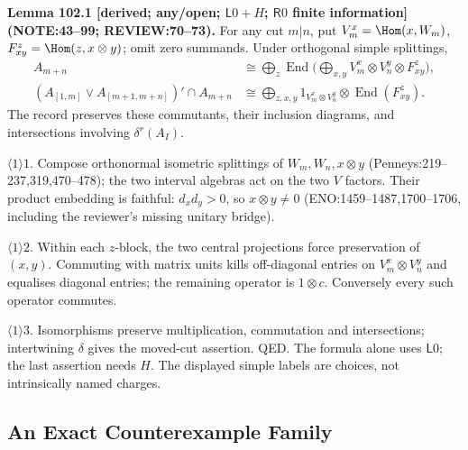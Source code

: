 \textbf{Lemma 102.1 [derived; any/open; \(\mathsf L0+H\); \(\mathsf R0\) finite information]\newline (NOTE:43--99; REVIEW:70--73).}
For any cut \(m|n\), put \(V_m^x=\Hom(x,W_m)\), \(F_{xy}^z=\Hom(z,x\otimes y)\); omit zero summands.
Under orthogonal simple splittings,
\begin{equation}\label{eq:102-cut}
\begin{split}
 A_{m+n}&\cong\bigoplus_z\operatorname{End}\Big(\bigoplus_{x,y}V_m^x\otimes V_n^y\otimes F_{xy}^z\Big),\\
 (A_{[1,m]}\vee A_{[m+1,m+n]})'\cap A_{m+n}
 &\cong\bigoplus_{z,x,y}1_{V_m^x\otimes V_n^y}\otimes\operatorname{End}(F_{xy}^z).
\end{split}
\end{equation}
The record preserves these commutants, their inclusion diagrams, and intersections involving \(\delta^r(A_I)\).
\par\(\langle1\rangle1\). Compose orthonormal isometric splittings of \(W_m,W_n,x\otimes y\)
(Penneys:219--237,319,470--478); the two interval algebras act on the two \(V\) factors.
Their product embedding is faithful: \(d_xd_y>0\), so \(x\otimes y\ne0\)
(ENO:1459--1487,1700--1706, including the reviewer's missing unitary bridge).
\par\(\langle1\rangle2\). Within each \(z\)-block, the two central projections force preservation of \((x,y)\).
Commuting with matrix units kills off-diagonal entries on \(V_m^x\otimes V_n^y\) and equalises diagonal entries;
the remaining operator is \(1\otimes c\). Conversely every such operator commutes.
\par\(\langle1\rangle3\). Isomorphisms preserve multiplication, commutation and intersections; intertwining
\(\delta\) gives the moved-cut assertion. QED. The formula alone uses \(\mathsf L0\); the last assertion needs \(H\).
The displayed simple labels are choices, not intrinsically named charges.

\subsection{An Exact Counterexample Family}

